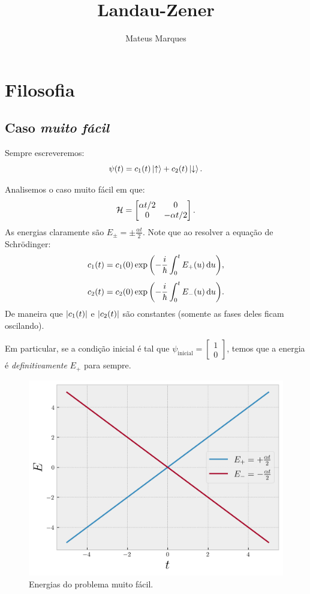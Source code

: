 \documentclass[a4paper,fleqn,12pt]{article}
\title{\Huge{\textbf{Landau-Zener}}}
\author{Mateus Marques}
\begin{document}
\maketitle

\section{Filosofia}

\subsection{Caso \textit{muito fácil}}

Sempre escreveremos:
$$
\psi(t) = c_1(t) \ket{\uparrow} + c_2(t) \ket{\downarrow}.
$$

\n

Analisemos o caso muito fácil em que:
$$
\mathcal{H} =
\begin{bmatrix}
\alpha t/2 & 0 \\
0 & -\alpha t/2
\end{bmatrix}.
$$
As energias claramente são $E_{\pm} = \pm \frac{\alpha t}{2}$. Note que ao resolver a equação de Schrödinger:
$$
c_1(t) = c_1(0) \exp\qty(-\frac{i}{\hbar} \int_0^t E_+(u) \dd{u}),
$$
$$
c_2(t) = c_2(0) \exp\qty(-\frac{i}{\hbar} \int_0^t E_-(u) \dd{u}).
$$
De maneira que $\abs{c_1(t)}$ e $\abs{c_2(t)}$ são constantes (somente as fases deles ficam oscilando).

Em particular, se a condição inicial é tal que
$\psi_{\text{inicial}} = \begin{bmatrix} 1 \\ 0 \end{bmatrix}$, temos que a energia é \textit{definitivamente} $E_+$ para sempre.

\begin{figure}[H]
\centering
\includegraphics[scale=0.8]{figures/nogap.png}
\caption{Energias do problema muito fácil.}
\label{fig:nogap}
\end{figure}
\end{document}
